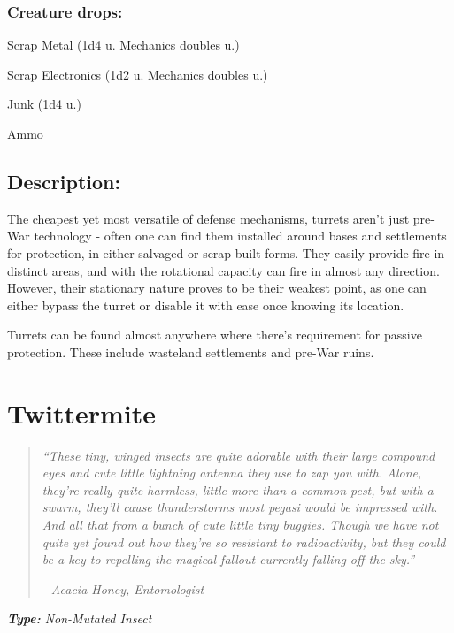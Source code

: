 \documentclass[11pt,a4paper,twocolumn]{book}
\begin{document}
	\subsubsection*{Creature drops:}
	\begin{compactitem}
		\item Scrap Metal (1d4 u. Mechanics doubles u.)
		\item Scrap Electronics (1d2 u. Mechanics doubles u.)
		\item Junk (1d4 u.)
		\item Ammo
	\end{compactitem}
	
	\subsection*{Description:}
	The cheapest yet most versatile of defense mechanisms, turrets aren't just pre-War technology - often one can find them installed around bases and settlements for protection, in either salvaged or scrap-built forms. They easily provide fire in distinct areas, and with the rotational capacity can fire in almost any direction. However, their stationary nature proves to be their weakest point, as one can either bypass the turret or disable it with ease once knowing its location.
	
	Turrets can be found almost anywhere where there's requirement for passive protection. These include wasteland settlements and pre-War ruins.
	
	\clearpage
	
	\section*{Twittermite}
	\begin{quote}
		\emph{``These tiny, winged insects are quite adorable with their large compound eyes and cute little lightning antenna they use to zap you with. Alone, they're really quite harmless, little more than a common pest, but with a swarm, they'll cause thunderstorms most pegasi would be impressed with. And all that from a bunch of cute little tiny buggies. Though we have not quite yet found out how they're so resistant to radioactivity, but they could be a key to repelling the magical fallout currently falling off the sky.''}
		
		\emph{-	Acacia Honey, Entomologist}
	\end{quote}
	
	\emph{\textbf{Type:} Non-Mutated Insect}
	
\end{document}
